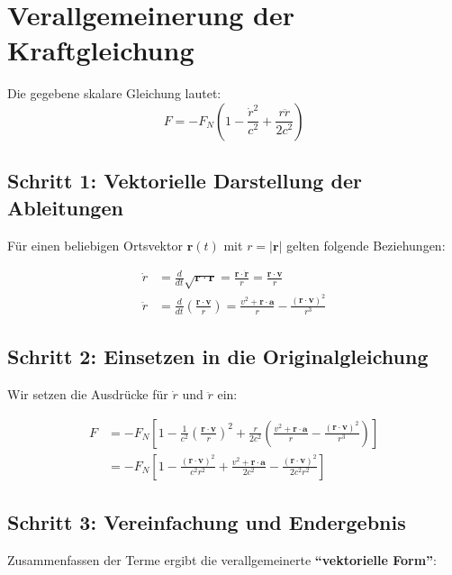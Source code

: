\section{Verallgemeinerung der Kraftgleichung}

Die gegebene skalare Gleichung lautet:
\begin{equation}
F = -F_N \left(1 - \frac{\dot{r}^2}{c^2} + \frac{r\ddot{r}}{2c^2}\right)
\end{equation}

\subsection{Schritt 1: Vektorielle Darstellung der Ableitungen}

Für einen beliebigen Ortsvektor $\mathbf{r}(t)$ mit $r = |\mathbf{r}|$ gelten folgende Beziehungen:

\begin{align}
\dot{r} &= \frac{d}{dt}\sqrt{\mathbf{r}\cdot\mathbf{r}} = \frac{\mathbf{r}\cdot\dot{\mathbf{r}}}{r} = \frac{\mathbf{r}\cdot\mathbf{v}}{r} \\
\ddot{r} &= \frac{d}{dt}\left(\frac{\mathbf{r}\cdot\mathbf{v}}{r}\right) = \frac{v^2 + \mathbf{r}\cdot\mathbf{a}}{r} - \frac{(\mathbf{r}\cdot\mathbf{v})^2}{r^3}
\end{align}

\subsection{Schritt 2: Einsetzen in die Originalgleichung}

Wir setzen die Ausdrücke für $\dot{r}$ und $\ddot{r}$ ein:

\begin{align}
F &= -F_N \left[1 - \frac{1}{c^2}\left(\frac{\mathbf{r}\cdot\mathbf{v}}{r}\right)^2 + \frac{r}{2c^2}\left(\frac{v^2 + \mathbf{r}\cdot\mathbf{a}}{r} - \frac{(\mathbf{r}\cdot\mathbf{v})^2}{r^3}\right)\right] \\
&= -F_N \left[1 - \frac{(\mathbf{r}\cdot\mathbf{v})^2}{c^2 r^2} + \frac{v^2 + \mathbf{r}\cdot\mathbf{a}}{2c^2} - \frac{(\mathbf{r}\cdot\mathbf{v})^2}{2c^2 r^2}\right]
\end{align}

\subsection{Schritt 3: Vereinfachung und Endergebnis}

Zusammenfassen der Terme ergibt die verallgemeinerte \textbf{\enquote{vektorielle Form}}:

